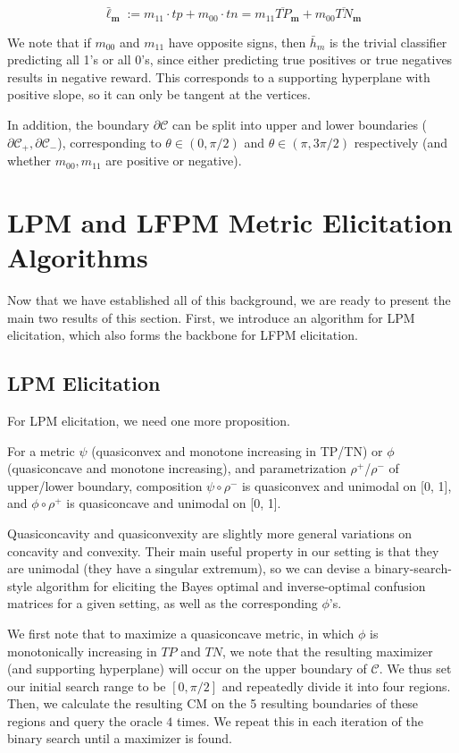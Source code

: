 \documentclass[
  letterpaper,
  DIV=11,
  numbers=noendperiod,
  oneside]{scrreprt}
\theoremstyle{remark}
\begin{document}
\[\bar{\ell}_{\mathbf{m}}:=m_{11} \cdot tp+m_{00} \cdot tn=m_{11} \overline{TP}_{\mathbf{m}}+m_{00} \overline{TN}_{\mathbf{m}}\]

We note that if \(m_{00}\) and \(m_{11}\) have opposite signs, then
\(\bar{h}_m\) is the trivial classifier predicting all 1's or all 0's,
since either predicting true positives or true negatives results in
negative reward. This corresponds to a supporting hyperplane with
positive slope, so it can only be tangent at the vertices.

In addition, the boundary \(\partial \mathcal{C}\) can be split into
upper and lower boundaries
(\(\partial \mathcal{C}_{+}, \partial \mathcal{C}_{-}\)), corresponding
to \(\theta \in (0, \pi/2)\) and \(\theta \in (\pi, 3\pi/2)\)
respectively (and whether \(m_{00}, m_{11}\) are positive or negative).

\section{LPM and LFPM Metric Elicitation
Algorithms}\label{sec:orga500da0}

Now that we have established all of this background, we are ready to
present the main two results of this section. First, we introduce an
algorithm for LPM elicitation, which also forms the backbone for LFPM
elicitation.

\subsection{LPM Elicitation}\label{sec:orgb6dac4e}

For LPM elicitation, we need one more proposition.

For a metric \(\psi\) (quasiconvex and monotone increasing in TP/TN) or
\(\phi\) (quasiconcave and monotone increasing), and parametrization
\(\rho^+\)/\(\rho^-\) of upper/lower boundary, composition
\(\psi \circ \rho^-\) is quasiconvex and unimodal on {[}0, 1{]}, and
\(\phi \circ \rho^+\) is quasiconcave and unimodal on {[}0, 1{]}.

Quasiconcavity and quasiconvexity are slightly more general variations
on concavity and convexity. Their main useful property in our setting is
that they are unimodal (they have a singular extremum), so we can devise
a binary-search-style algorithm for eliciting the Bayes optimal and
inverse-optimal confusion matrices for a given setting, as well as the
corresponding \(\phi\)'s.

We first note that to maximize a quasiconcave metric, in which \(\phi\)
is monotonically increasing in \(TP\) and \(TN\), we note that the
resulting maximizer (and supporting hyperplane) will occur on the upper
boundary of \(\mathcal{C}\). We thus set our initial search range to be
\([0, \pi/2]\) and repeatedly divide it into four regions. Then, we
calculate the resulting CM on the 5 resulting boundaries of these
regions and query the oracle \(4\) times. We repeat this in each
iteration of the binary search until a maximizer is found.
\end{document}
